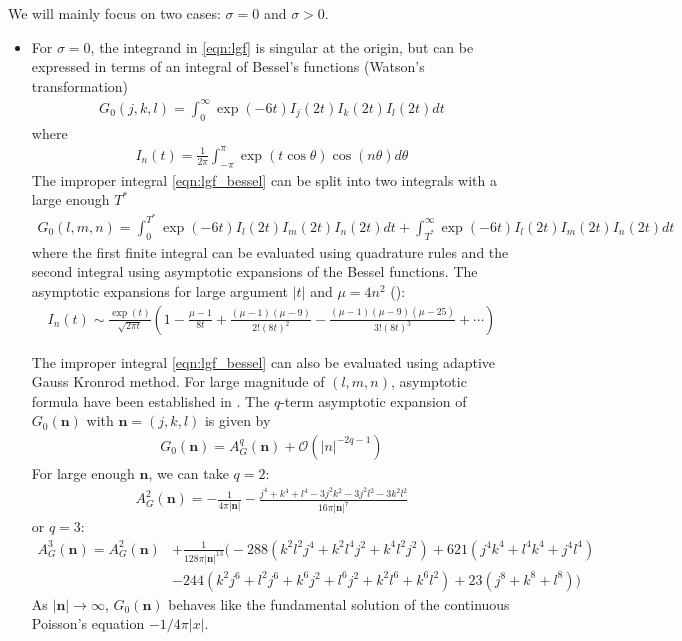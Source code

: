 We will mainly focus on two cases: $\sigma=0$ and $\sigma>0$. 
\begin{itemize}
	\item 
For $\sigma=0$, the integrand in \eqref{eqn:lgf} is singular at the origin, but can be expressed in terms of an integral of Bessel's functions (Watson's transformation)
\begin{align}\label{eqn:lgf_bessel}
G_{0}(j,k,l)=\int_0^\infty\exp(-6t)I_j(2t)I_k(2t)I_l(2t)dt
\end{align}
where 
\begin{align}
I_n(t)  = \frac{1}{2\pi}\int_{-\pi}^{\pi} \exp(t\cos\theta)\cos(n\theta)d\theta
\end{align}
The improper integral \eqref{eqn:lgf_bessel} can be split into two integrals with a large enough $T^*$
\begin{align}
G_{0}(l,m,n) = \int_0^{T^*}\exp(-6t)I_l(2t)I_m(2t)I_n(2t)dt+\int_{T^*}^\infty\exp(-6t)I_l(2t)I_m(2t)I_n(2t)dt
\end{align}
where the first finite integral can be evaluated using quadrature rules and the second integral using asymptotic expansions of the Bessel functions. The asymptotic expansions for large argument $|t|$ and $\mu=4n^2$ (\cite[p375-377]{abramowitz1948handbook}):
\begin{align}
I_n(t) \sim \frac{\exp(t)}{\sqrt{2\pi t}}\left(1-\frac{\mu-1}{8t}+\frac{(\mu-1)(\mu-9)}{2!(8t)^2}-\frac{(\mu-1)(\mu-9)(\mu-25)}{3!(8t)^3}+\cdots\right)
\end{align}

The improper integral \eqref{eqn:lgf_bessel} can also be evaluated using adaptive Gauss Kronrod method. For large magnitude of $(l,m,n)$, asymptotic formula have been established in \cite{martinsson2002asymptotic}. The $q$-term asymptotic expansion of $G_{0}(\bm{n})$ with $\bm{n}=(j,k,l)$ is given by
\begin{align}
G_{0}(\bm{n}) = A_G^q(\bm{n})+\mathcal{O}(|n|^{-2q-1})
\end{align}
For large enough $\bm{n}$, we can take $q=2$:
\begin{align}
A^2_G(\bm{n})=-\frac{1}{4\pi|\bm{n}|}-\frac{j^4+k^4+l^4-3j^2k^2-3j^2l^2-3k^2l^2}{16\pi|\bm{n}|^7}
\end{align}
or $q=3$:
\begin{align}
A_G^3(\bm{n}) = A^2_G(\bm{n})&+\frac{1}{128\pi|\bm{n}|^{13}}\Big(-288(k^2l^2j^4+k^2l^4j^2+k^4l^2j^2)+621(j^4k^4+l^4k^4+j^4l^4)\nonumber\\
&-244(k^2j^6+l^2j^6+k^6j^2+l^6j^2+k^2l^6+k^6l^2)+23(j^8+k^8+l^8)\Big)
\end{align}
As $|\bm{n}|\rightarrow\infty$, $G_{0}(\bm{n})$ behaves like the fundamental solution of the continuous Poisson's equation $-1/4\pi |x|$.


\end{itemize}
